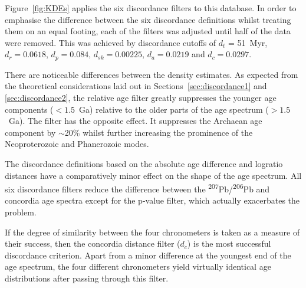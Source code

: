 \documentclass[gchron, manuscript]{copernicus}
\begin{document}
Figure~\ref{fig:KDEs} applies the six discordance filters to this
database. In order to emphasise the difference between the six
discordance definitions whilst treating them on an equal footing, each
of the filters was adjusted until half of the data were removed. This
was achieved by discordance cutoffs of $d_t$ = 51~Myr, $d_r = 0.0618$,
$d_{p} = 0.084$, $d_{sk} = 0.00225$, $d_a = 0.0219$ and $d_c =
0.0297$.

There are noticeable differences between the density estimates.  As
expected from the theoretical considerations laid out in
Sections~\ref{sec:discordance1} and \ref{sec:discordance2}, the
relative age filter greatly suppresses the younger age components
($<1.5$~Ga) relative to the older parts of the age spectrum
($>1.5$~Ga). The \citet{stacey1975} filter has the opposite effect.
It suppresses the Archaean age component by $\sim$20\% whilst further
increasing the prominence of the Neoproterozoic and Phanerozoic modes.

The discordance definitions based on the absolute age difference and
logratio distances have a comparatively minor effect on the shape of
the age spectrum. All six discordance filters reduce the difference
between the \textsuperscript{207}Pb/\textsuperscript{206}Pb and
concordia age spectra except for the p-value filter, which actually
exacerbates the problem.

If the degree of similarity between the four chronometers is taken as
a measure of their success, then the concordia distance filter ($d_c$)
is the most successful discordance criterion. Apart from a minor
difference at the youngest end of the age spectrum, the four different
chronometers yield virtually identical age distributions after passing
through this filter.
\end{document}
